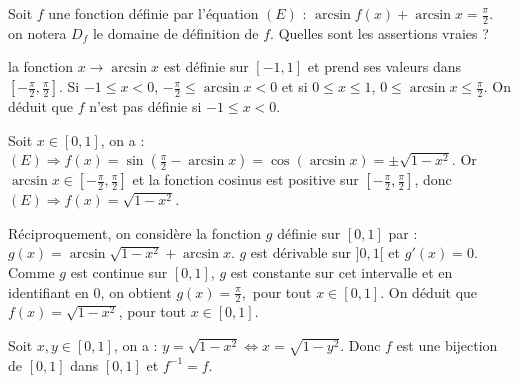 \begin{question} 

Soit $f$ une fonction définie par l'équation $(E)$ : $ \arcsin f(x) + \arcsin x = \frac{\pi}{2}$. on notera $D_f$ le domaine de définition de $f$. Quelles sont les assertions vraies ?
\begin{answers}



\end{answers}
\begin{explanations}
la fonction $x \to \arcsin x$ est définie sur $[-1,1]$ et prend ses valeurs dans $[-\frac{\pi}{2}, \frac{\pi}{2}]$. Si $-1\le x <0$, $-\frac{\pi}{2}  \le  \arcsin x <0$ et si $0\le  x \le 1$, $0\le   \arcsin x \le  \frac{\pi}{2}$. On déduit que $f$ n'est pas définie si  $-1\le x <0$.

Soit $x \in [0,1]$, on a : $(E) \Rightarrow f(x)= \sin (\frac{\pi}{2} - \arcsin x) = \cos (\arcsin x) = \pm \sqrt{1-x^2} $. Or $\arcsin x \in [-\frac{\pi}{2}, \frac{\pi}{2}] $ et la fonction cosinus est positive sur $[-\frac{\pi}{2}, \frac{\pi}{2}] $, donc $(E) \Rightarrow f(x)= \sqrt{1-x^2}$. 

Réciproquement, on considère la fonction $g$ définie sur $[0,1]$ par : $g(x) =  \arcsin  \sqrt{1-x^2} + \arcsin x$. $g$ est dérivable sur $]0,1[$ et $g'(x)= 0$. Comme $g$ est continue sur $[0,1]$,  $g$ est constante sur cet intervalle et en identifiant en $0$, on obtient $g(x)= \frac{\pi}{2},$ pour tout $x \in [0,1]$. On déduit que $f(x) = \sqrt{1-x^2}$, pour tout $x \in [0,1]$. 

Soit $x, y \in [0,1]$, on a : $y=\sqrt{1-x^2} \Leftrightarrow x = \sqrt{1-y^2}$. Donc $f$ est une bijection de $[0,1]$ dans $[0,1]$ et $f^{-1} = f$.
\end{explanations}
\end{question}






